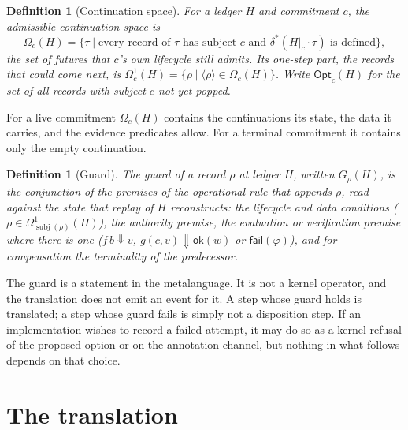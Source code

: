\documentclass[11pt,openany]{book}
\newtheorem{definition}[theorem]{Definition}
\theoremstyle{remark}
\newcommand{\subj}{\operatorname{subj}}
\begin{document}
\begin{definition}[Continuation space]
For a ledger $H$ and commitment $c$, the \emph{admissible continuation
space} is
\[
\Omega_c(H)=\{\tau\mid\text{every record of }\tau\text{ has subject }c
\text{ and }\delta^{*}(H|_c\cdot\tau)\text{ is defined}\},
\]
the set of futures that $c$'s own lifecycle still admits. Its one-step
part, the records that could come next, is
$\Omega^1_c(H)=\{\rho\mid\langle\rho\rangle\in\Omega_c(H)\}$. Write
$\mathsf{Opt}_c(H)$ for the set of all records with subject $c$ not yet
popped.
\end{definition}

For a live commitment $\Omega_c(H)$ contains the continuations its state,
the data it carries, and the evidence predicates allow. For a terminal
commitment it contains only the empty continuation.

\begin{definition}[Guard]
The \emph{guard} of a record $\rho$ at ledger $H$, written $G_\rho(H)$, is
the conjunction of the premises of the operational rule that appends
$\rho$, read against the state that replay of $H$ reconstructs: the
lifecycle and data conditions ($\rho\in\Omega^1_{\subj(\rho)}(H)$), the
authority premise, the evaluation or verification premise where there is
one ($f\,b\Downarrow v$, $g(c,v)\Downarrow\mathsf{ok}(w)$ or
$\mathsf{fail}(\varphi)$), and for compensation the terminality of the
predecessor.
\end{definition}

The guard is a statement in the metalanguage. It is not a kernel operator,
and the translation does not emit an event for it. A step whose guard
holds is translated; a step whose guard fails is simply not a
disposition step. If an implementation wishes to record a failed attempt,
it may do so as a kernel refusal of the proposed option or on the
annotation channel, but nothing in what follows depends on that choice.

\section{The translation}
\label{sec:translation}
\end{document}
